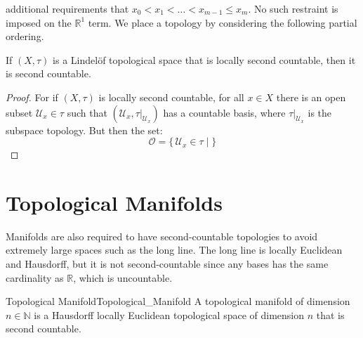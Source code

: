 \documentclass[oneside]{book}                                                  %
\begin{document}
            additional requirements that $x_{0}<x_{1}<\dots<x_{m-1}\leq{x}_{m}$.
            No such restraint is imposed on the $\mathbb{R}^{1}$ term. We place
            a topology by considering the following partial ordering.
            \begin{theorem}
                If $(X,\tau)$ is a Lindel\"{o}f topological space that is
                locally second countable, then it is second countable.
            \end{theorem}
            \begin{proof}
                For if $(X,\tau)$ is locally second countable, for all $x\in{X}$
                there is an open subset $\mathcal{U}_{x}\in\tau$ such that
                $(\mathcal{U}_{x},\tau|_{\mathcal{U}_{x}})$ has a countable
                basis, where $\tau|_{\mathcal{U}_{x}}$ is the subspace topology.
                But then the set:
                \begin{equation}
                    \mathcal{O}=
                    \{\,\mathcal{U}_{x}\in\tau\;|\;\}
                \end{equation}
            \end{proof}
        \section{Topological Manifolds}
            Manifolds are also required to have second-countable topologies to
            avoid extremely large spaces such as the long line.
            The long line is locally Euclidean and Hausdorff, but it is not
            second-countable since any bases has the same cardinality as
            $\mathbb{R}$, which is uncountable.
            \begin{fdefinition}{Topological Manifold}{Topological_Manifold}
                A topological manifold of dimension $n\in\mathbb{N}$ is a
                Hausdorff locally Euclidean topological space of dimension $n$
                that is second countable.
            \end{fdefinition}
\end{document}
